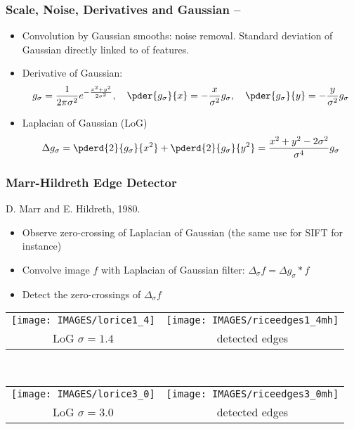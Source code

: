 \documentclass[9pt]{beamer}
\newcommand{\myemph}[1]{{\color{blue}{#1}}}
\begin{document}
\begin{frame}
  \frametitle{Scale, Noise, Derivatives and Gaussian -- }
  \begin{itemize} 
  \item Convolution by Gaussian smooths: noise removal. Standard
    deviation of Gaussian directly linked to \myemph{scale} of
    features.
  \item Derivative of Gaussian:
    $$
    g_\sigma = \frac{1}{2\pi\sigma^2}e^{-\frac{x^2 + y^2}{2\sigma^2}},\quad \pder{g_\sigma}{x} = -\frac{x}{\sigma^2}g_\sigma,\quad
    \pder{g_\sigma}{y} = -\frac{y}{\sigma^2}g_\sigma
    $$
  \item Laplacian of Gaussian (LoG)
    $$
    \Delta g_\sigma = \pderd{2}{g_\sigma}{x^2} +  \pderd{2}{g_\sigma}{y^2} = \frac{x^2 + y^2 - 2\sigma^2}{\sigma^4}g_\sigma
    $$
  \end{itemize}
\end{frame}




\begin{frame}
  \frametitle{Marr-Hildreth Edge Detector}
  D. Marr and E. Hildreth, 1980.
  \begin{itemize}
  \item Observe zero-crossing of Laplacian of Gaussian (the same use for SIFT for instance)
  \item Convolve image $f$ with Laplacian of Gaussian filter: $\Delta_\sigma f = \Delta g_\sigma \ast f$  
  \item Detect the zero-crossings of $\Delta_\sigma f$
  \end{itemize}
  \begin{center}
    \begin{tabular}[h]{cc}
      \texttt{[image: IMAGES/lorice1\_4]}& 
      \texttt{[image: IMAGES/riceedges1\_4mh]}\\
      LoG $\sigma = 1.4$ & detected edges
    \end{tabular}\\
    \begin{tabular}[h]{cc}
      \texttt{[image: IMAGES/lorice3\_0]}& 
      \texttt{[image: IMAGES/riceedges3\_0mh]}\\
      LoG $\sigma = 3.0$ & detected edges
    \end{tabular}\\
  \end{center}
\end{frame}
\end{document}
